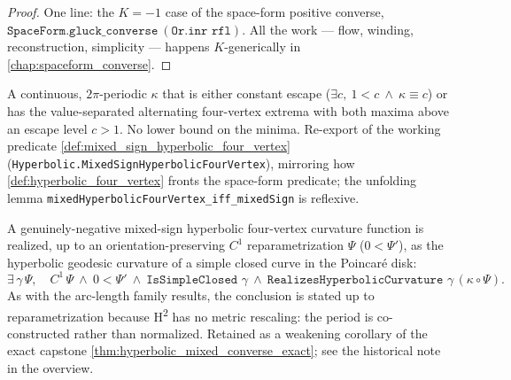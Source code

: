 \begin{proof}
  \leanok
  One line: the $K=-1$ case of the space-form positive converse,
  $\texttt{SpaceForm.gluck\_converse}\ (\texttt{Or.inr rfl})$. All the
  work — flow, winding, reconstruction, simplicity — happens
  $K$-generically in \cref{chap:spaceform_converse}.
\end{proof}

\begin{definition}
  \label{def:mixed_hyperbolic_four_vertex}
  \leanok
  A continuous, $2\pi$-periodic $\kappa$ that is either constant escape
  ($\exists c,\ 1<c\ \wedge\ \kappa\equiv c$) or has the value-separated
  alternating four-vertex extrema with both maxima above an escape level $c>1$.
  No lower bound on the minima. Re-export of the working predicate
  \cref{def:mixed_sign_hyperbolic_four_vertex}
  (\texttt{Hyperbolic.MixedSignHyperbolicFourVertex}), mirroring how
  \cref{def:hyperbolic_four_vertex} fronts the space-form predicate; the
  unfolding lemma \texttt{mixedHyperbolicFourVertex\_iff\_mixedSign} is
  reflexive.
\end{definition}

\begin{theorem}
  \label{thm:hyperbolic_mixed_converse}
  \leanok
  A genuinely-negative mixed-sign hyperbolic four-vertex curvature function is
  realized, up to an orientation-preserving $C^1$ reparametrization $\Psi$
  ($0<\Psi'$), as the hyperbolic geodesic curvature of a simple closed curve in
  the Poincar\'e disk:
  \[
    \exists\,\gamma\,\Psi,\quad C^1\,\Psi\ \wedge\ 0<\Psi'\ \wedge\
    \texttt{IsSimpleClosed }\gamma\ \wedge\
    \texttt{RealizesHyperbolicCurvature }\gamma\,(\kappa\circ\Psi).
  \]
  As with the arc-length family results, the conclusion is stated up to
  reparametrization because H\textsuperscript{2} has no metric rescaling: the
  period is co-constructed rather than normalized. Retained as a weakening
  corollary of the exact capstone
  \cref{thm:hyperbolic_mixed_converse_exact}; see the historical note in the
  overview.
\end{theorem}

